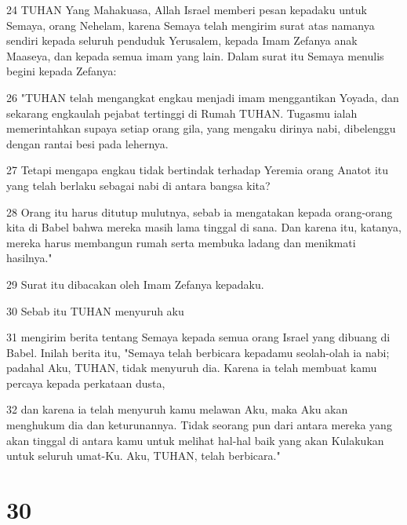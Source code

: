 \par 24 TUHAN Yang Mahakuasa, Allah Israel memberi pesan kepadaku untuk Semaya, orang Nehelam, karena Semaya telah mengirim surat atas namanya sendiri kepada seluruh penduduk Yerusalem, kepada Imam Zefanya anak Maaseya, dan kepada semua imam yang lain. Dalam surat itu Semaya menulis begini kepada Zefanya:
\par 26 "TUHAN telah mengangkat engkau menjadi imam menggantikan Yoyada, dan sekarang engkaulah pejabat tertinggi di Rumah TUHAN. Tugasmu ialah memerintahkan supaya setiap orang gila, yang mengaku dirinya nabi, dibelenggu dengan rantai besi pada lehernya.
\par 27 Tetapi mengapa engkau tidak bertindak terhadap Yeremia orang Anatot itu yang telah berlaku sebagai nabi di antara bangsa kita?
\par 28 Orang itu harus ditutup mulutnya, sebab ia mengatakan kepada orang-orang kita di Babel bahwa mereka masih lama tinggal di sana. Dan karena itu, katanya, mereka harus membangun rumah serta membuka ladang dan menikmati hasilnya."
\par 29 Surat itu dibacakan oleh Imam Zefanya kepadaku.
\par 30 Sebab itu TUHAN menyuruh aku
\par 31 mengirim berita tentang Semaya kepada semua orang Israel yang dibuang di Babel. Inilah berita itu, "Semaya telah berbicara kepadamu seolah-olah ia nabi; padahal Aku, TUHAN, tidak menyuruh dia. Karena ia telah membuat kamu percaya kepada perkataan dusta,
\par 32 dan karena ia telah menyuruh kamu melawan Aku, maka Aku akan menghukum dia dan keturunannya. Tidak seorang pun dari antara mereka yang akan tinggal di antara kamu untuk melihat hal-hal baik yang akan Kulakukan untuk seluruh umat-Ku. Aku, TUHAN, telah berbicara."

\chapter{30}

